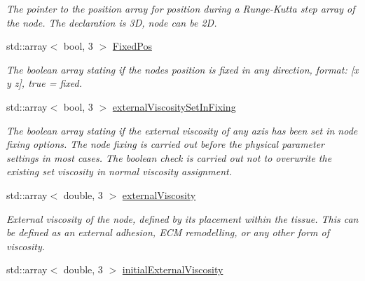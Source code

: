 \begin{DoxyCompactItemize}
\begin{DoxyCompactList}\small\item\em The pointer to the position array for position during a Runge-\/\+Kutta step array of the node. The declaration is 3\+D, node can be 2\+D. \end{DoxyCompactList}\item 
\hypertarget{classNode_a8f3a763935fb67e34784d060c0ea76f8}{}std\+::array$<$ bool, 3 $>$ \hyperlink{classNode_a8f3a763935fb67e34784d060c0ea76f8}{Fixed\+Pos}\label{classNode_a8f3a763935fb67e34784d060c0ea76f8}

\begin{DoxyCompactList}\small\item\em The boolean array stating if the node\textquotesingle{}s position is fixed in any direction, format\+: \mbox{[}x y z\mbox{]}, true = fixed. \end{DoxyCompactList}\item 
\hypertarget{classNode_a6c133172953bbe1451075ef7b78db6b7}{}std\+::array$<$ bool, 3 $>$ \hyperlink{classNode_a6c133172953bbe1451075ef7b78db6b7}{external\+Viscosity\+Set\+In\+Fixing}\label{classNode_a6c133172953bbe1451075ef7b78db6b7}

\begin{DoxyCompactList}\small\item\em The boolean array stating if the external viscosity of any axis has been set in node fixing options. The node fixing is carried out before the physical parameter settings in most cases. The boolean check is carried out not to overwrite the existing set viscosity in normal viscosity assignment. \end{DoxyCompactList}\item 
\hypertarget{classNode_a6377f135c12aae0dd776107c2628516e}{}std\+::array$<$ double, 3 $>$ \hyperlink{classNode_a6377f135c12aae0dd776107c2628516e}{external\+Viscosity}\label{classNode_a6377f135c12aae0dd776107c2628516e}

\begin{DoxyCompactList}\small\item\em External viscosity of the node, defined by its placement within the tissue. This can be defined as an external adhesion, E\+C\+M remodelling, or any other form of viscosity. \end{DoxyCompactList}\item 
\hypertarget{classNode_a1d6adc185162f9fea733839c4e7230f7}{}std\+::array$<$ double, 3 $>$ \hyperlink{classNode_a1d6adc185162f9fea733839c4e7230f7}{initial\+External\+Viscosity}\label{classNode_a1d6adc185162f9fea733839c4e7230f7}


\end{DoxyCompactItemize}
